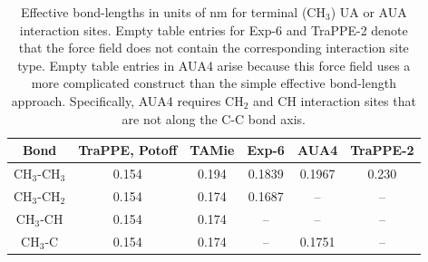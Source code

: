 \documentclass[preprint,letterpaper,floatfix,citeautoscript,aip,jcp]{revtex4-1}
\begin{document}
\begin{table}[h!]
	\caption{Effective bond-lengths in units of nm for terminal (CH$_3$) UA or AUA interaction sites. Empty table entries for Exp-6 and TraPPE-2 denote that the force field does not contain the corresponding interaction site type. Empty table entries in AUA4 arise because this force field uses a more complicated construct than the simple effective bond-length approach. Specifically, AUA4 requires CH$_2$ and CH interaction sites that are not along the C-C bond axis.} \label{tab:bond-lengths}
	\begin{center}
		\begin{tabular}{|c|c|c|c|c|c|}
			\hline
			Bond & TraPPE, Potoff & TAMie & Exp-6 & AUA4 & TraPPE-2 \\ \hline
			CH$_3$-CH$_3$ & 0.154 & 0.194 & 0.1839 & 0.1967 & 0.230 \\ 
			CH$_3$-CH$_2$ & 0.154 & 0.174 & 0.1687 & -- & -- \\ 
			CH$_3$-CH & 0.154 & 0.174 & -- & -- & -- \\
			CH$_3$-C & 0.154 & 0.174 & -- & 0.1751 & -- \\
			\hline
		\end{tabular}
	\end{center} 
\end{table}

\end{document}
